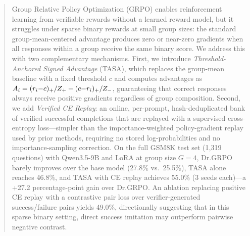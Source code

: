 \begin{abstract}
Group Relative Policy Optimization (GRPO) enables reinforcement learning from verifiable rewards without a learned reward model, but it struggles under sparse binary rewards at small group sizes: the standard group-mean-centered advantage produces zero or near-zero gradients when all responses within a group receive the same binary score.
We address this with two complementary mechanisms.
First, we introduce \emph{Threshold-Anchored Signed Advantage} (TASA), which replaces the group-mean baseline with a fixed threshold $c$ and computes advantages as $A_i = (r_i{-}c)_+/\Zp - (c{-}r_i)_+/\Zm$, guaranteeing that correct responses always receive positive gradients regardless of group composition.
Second, we add \emph{Verified CE Replay}: an online, per-prompt, hash-deduplicated bank of verified successful completions that are replayed with a supervised cross-entropy loss---simpler than the importance-weighted policy-gradient replay used by prior methods, requiring no stored log-probabilities and no importance-sampling correction.
On the full GSM8K test set (1{,}319 questions) with Qwen3.5-9B and LoRA at group size $G{=}4$, Dr.GRPO barely improves over the base model (27.8\% vs.\ 25.5\%), TASA alone reaches 46.8\%, and TASA with CE replay achieves 55.0\% (3 seeds each)---a +27.2 percentage-point gain over Dr.GRPO.
An ablation replacing positive CE replay with a contrastive pair loss over verifier-generated success/failure pairs yields 49.0\%, directionally suggesting that in this sparse binary setting, direct success imitation may outperform pairwise negative contrast.
\end{abstract}
